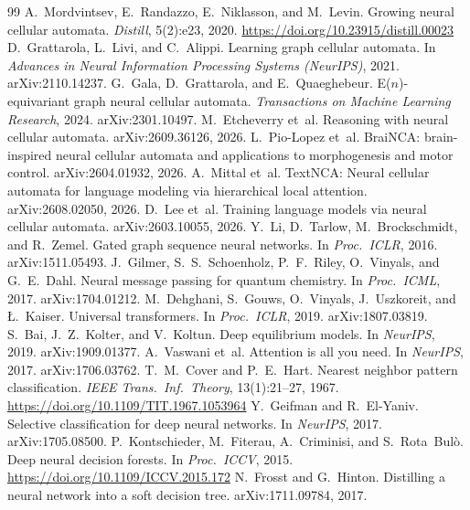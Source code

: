 \documentclass[10pt,twocolumn,letterpaper]{article}
\begin{document}
\begin{thebibliography}{99}\small
{} A.~Mordvintsev, E.~Randazzo, E.~Niklasson, and M.~Levin. Growing neural cellular automata. \emph{Distill}, 5(2):e23, 2020. \url{https://doi.org/10.23915/distill.00023}
 D.~Grattarola, L.~Livi, and C.~Alippi. Learning graph cellular automata. In \emph{Advances in Neural Information Processing Systems (NeurIPS)}, 2021. arXiv:2110.14237.
 G.~Gala, D.~Grattarola, and E.~Quaeghebeur. E($n$)-equivariant graph neural cellular automata. \emph{Transactions on Machine Learning Research}, 2024. arXiv:2301.10497.
 M.~Etcheverry et~al. Reasoning with neural cellular automata. arXiv:2609.36126, 2026.
 L.~Pio-Lopez et~al. BraiNCA: brain-inspired neural cellular automata and applications to morphogenesis and motor control. arXiv:2604.01932, 2026.
 A.~Mittal et~al. TextNCA: Neural cellular automata for language modeling via hierarchical local attention. arXiv:2608.02050, 2026.
 D.~Lee et~al. Training language models via neural cellular automata. arXiv:2603.10055, 2026.
 Y.~Li, D.~Tarlow, M.~Brockschmidt, and R.~Zemel. Gated graph sequence neural networks. In \emph{Proc.\ ICLR}, 2016. arXiv:1511.05493.
 J.~Gilmer, S.~S.~Schoenholz, P.~F.~Riley, O.~Vinyals, and G.~E.~Dahl. Neural message passing for quantum chemistry. In \emph{Proc.\ ICML}, 2017. arXiv:1704.01212.
 M.~Dehghani, S.~Gouws, O.~Vinyals, J.~Uszkoreit, and {\L}.~Kaiser. Universal transformers. In \emph{Proc.\ ICLR}, 2019. arXiv:1807.03819.
 S.~Bai, J.~Z.~Kolter, and V.~Koltun. Deep equilibrium models. In \emph{NeurIPS}, 2019. arXiv:1909.01377.
 A.~Vaswani et~al. Attention is all you need. In \emph{NeurIPS}, 2017. arXiv:1706.03762.
 T.~M.~Cover and P.~E.~Hart. Nearest neighbor pattern classification. \emph{IEEE Trans.\ Inf.\ Theory}, 13(1):21--27, 1967. \url{https://doi.org/10.1109/TIT.1967.1053964}
 Y.~Geifman and R.~El-Yaniv. Selective classification for deep neural networks. In \emph{NeurIPS}, 2017. arXiv:1705.08500.
 P.~Kontschieder, M.~Fiterau, A.~Criminisi, and S.~Rota~Bul\`o. Deep neural decision forests. In \emph{Proc.\ ICCV}, 2015. \url{https://doi.org/10.1109/ICCV.2015.172}
 N.~Frosst and G.~Hinton. Distilling a neural network into a soft decision tree. arXiv:1711.09784, 2017.

\end{thebibliography}
\end{document}

